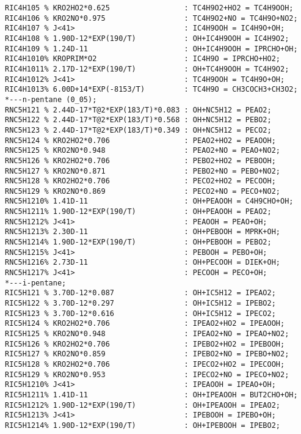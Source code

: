 \begin{verbatim}
RIC4H105 % KRO2HO2*0.625                 : TC4H9O2+HO2 = TC4H9OOH;
RIC4H106 % KRO2NO*0.975                  : TC4H9O2+NO = TC4H9O+NO2;
RIC4H107 % J<41>                         : IC4H9OOH = IC4H9O+OH;
RIC4H108 % 1.90D-12*EXP(190/T)           : OH+IC4H9OOH = IC4H9O2;
RIC4H109 % 1.24D-11                      : OH+IC4H9OOH = IPRCHO+OH;
RIC4H1010% KROPRIM*O2                    : IC4H9O = IPRCHO+HO2;
RIC4H1011% 2.17D-12*EXP(190/T)           : OH+TC4H9OOH = TC4H9O2;
RIC4H1012% J<41>                         : TC4H9OOH = TC4H9O+OH;
RIC4H1013% 6.00D+14*EXP(-8153/T)         : TC4H9O = CH3COCH3+CH3O2;
*---n-pentane (0_05);
RNC5H121 % 2.44D-17*T@2*EXP(183/T)*0.083 : OH+NC5H12 = PEAO2;
RNC5H122 % 2.44D-17*T@2*EXP(183/T)*0.568 : OH+NC5H12 = PEBO2;
RNC5H123 % 2.44D-17*T@2*EXP(183/T)*0.349 : OH+NC5H12 = PECO2;
RNC5H124 % KRO2HO2*0.706                 : PEAO2+HO2 = PEAOOH;
RNC5H125 % KRO2NO*0.948                  : PEAO2+NO = PEAO+NO2;
RNC5H126 % KRO2HO2*0.706                 : PEBO2+HO2 = PEBOOH;
RNC5H127 % KRO2NO*0.871                  : PEBO2+NO = PEBO+NO2;
RNC5H128 % KRO2HO2*0.706                 : PECO2+HO2 = PECOOH;
RNC5H129 % KRO2NO*0.869                  : PECO2+NO = PECO+NO2;
RNC5H1210% 1.41D-11                      : OH+PEAOOH = C4H9CHO+OH;
RNC5H1211% 1.90D-12*EXP(190/T)           : OH+PEAOOH = PEAO2;
RNC5H1212% J<41>                         : PEAOOH = PEAO+OH;
RNC5H1213% 2.30D-11                      : OH+PEBOOH = MPRK+OH;
RNC5H1214% 1.90D-12*EXP(190/T)           : OH+PEBOOH = PEBO2;
RNC5H1215% J<41>                         : PEBOOH = PEBO+OH;
RNC5H1216% 2.73D-11                      : OH+PECOOH = DIEK+OH;
RNC5H1217% J<41>                         : PECOOH = PECO+OH;
*---i-pentane;
RIC5H121 % 3.70D-12*0.087                : OH+IC5H12 = IPEAO2;
RIC5H122 % 3.70D-12*0.297                : OH+IC5H12 = IPEBO2;
RIC5H123 % 3.70D-12*0.616                : OH+IC5H12 = IPECO2;
RIC5H124 % KRO2HO2*0.706                 : IPEAO2+HO2 = IPEAOOH;
RIC5H125 % KRO2NO*0.948                  : IPEAO2+NO = IPEAO+NO2;
RIC5H126 % KRO2HO2*0.706                 : IPEBO2+HO2 = IPEBOOH;
RIC5H127 % KRO2NO*0.859                  : IPEBO2+NO = IPEBO+NO2;
RIC5H128 % KRO2HO2*0.706                 : IPECO2+HO2 = IPECOOH;
RIC5H129 % KRO2NO*0.953                  : IPECO2+NO = IPECO+NO2;
RIC5H1210% J<41>                         : IPEAOOH = IPEAO+OH;
RIC5H1211% 1.41D-11                      : OH+IPEAOOH = BUT2CHO+OH;
RIC5H1212% 1.90D-12*EXP(190/T)           : OH+IPEAOOH = IPEAO2;
RIC5H1213% J<41>                         : IPEBOOH = IPEBO+OH;
RIC5H1214% 1.90D-12*EXP(190/T)           : OH+IPEBOOH = IPEBO2;

\end{verbatim}

